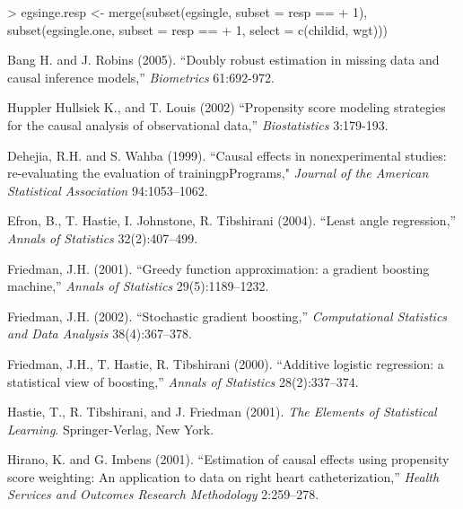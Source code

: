 \documentclass{article}
\begin{document}
\begin{Schunk}
\begin{Sinput}
> egsinge.resp <- merge(subset(egsingle, subset = resp == 
+     1), subset(egsingle.one, subset = resp == 
+     1, select = c(childid, wgt)))
\end{Sinput}
\end{Schunk}

\begin{thebibliography}{77}     %

\small                          %

 Bang H. and J. Robins (2005). ``Doubly robust estimation in missing data and
causal inference models,'' \textit{Biometrics} 61:692-972.

 Huppler Hullsiek K., and T. Louis (2002) 
``Propensity score modeling strategies for the causal analysis of observational data,'' 
\textit{Biostatistics} 3:179-193. 

 Dehejia, R.H. and S. Wahba (1999). ``Causal effects in nonexperimental
studies: re-evaluating the evaluation of trainingpPrograms," \textit{Journal
of the American Statistical Association} 94:1053--1062.

 Efron, B., T. Hastie, I. Johnstone, R. Tibshirani (2004). ``Least angle
regression,'' \textit{Annals of Statistics} 32(2):407--499.

 Friedman, J.H. (2001). ``Greedy function approximation: a gradient boosting
machine,'' \textit{Annals of Statistics} 29(5):1189--1232.

 Friedman, J.H. (2002). ``Stochastic gradient boosting,'' \textit{Computational
Statistics and Data Analysis} 38(4):367--378.

 Friedman, J.H., T. Hastie, R. Tibshirani (2000). ``Additive logistic regression:
a statistical view of boosting,'' \textit{Annals of Statistics} 28(2):337--374.

 Hastie, T., R. Tibshirani, and J. Friedman (2001). \textit{The Elements of
Statistical Learning}. Springer-Verlag, New York.

 Hirano, K. and G. Imbens (2001). ``Estimation of causal effects using
propensity score weighting: An application to data on right heart
catheterization,'' \textit{Health Services and Outcomes Research Methodology}
2:259--278.


\end{thebibliography}
\end{document}
